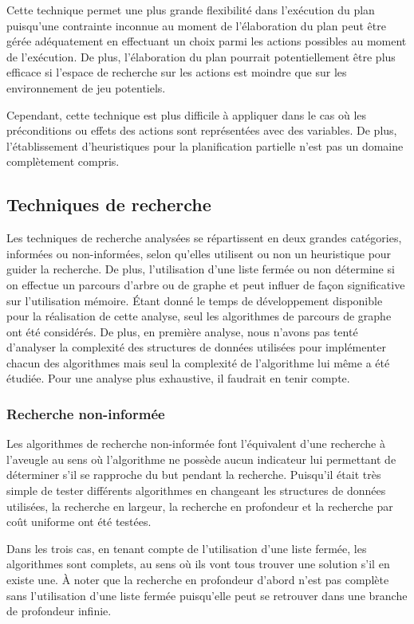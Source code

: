 \documentclass[12pt,english,frenchb,letterpaper]{article}
\begin{document}
Cette technique permet une plus grande flexibilité dans l'exécution du plan puisqu'une contrainte inconnue au moment de l'élaboration du plan peut être gérée adéquatement en effectuant un choix parmi les actions possibles au moment de l'exécution.  De plus, l'élaboration du plan pourrait potentiellement être plus efficace si l'espace de recherche sur les actions est moindre que sur les environnement de jeu potentiels.

Cependant, cette technique est plus difficile à appliquer dans le cas où les préconditions ou effets des actions sont représentées avec des variables.  De plus, l'établissement d'heuristiques pour la planification partielle n'est pas un domaine complètement compris.

\subsection{Techniques de recherche}
Les techniques de recherche analysées se répartissent en deux grandes catégories, informées ou non-informées, selon qu'elles utilisent ou non un heuristique pour guider la recherche.  De plus, l'utilisation d'une liste fermée ou non détermine si on effectue un parcours d'arbre ou de graphe et peut influer de fa\c con significative sur l'utilisation mémoire.  Étant donné le temps de développement disponible pour la réalisation de cette analyse, seul les algorithmes de parcours de graphe ont été considérés.  De plus, en première analyse, nous n'avons pas tenté d'analyser la complexité des structures de données utilisées pour implémenter chacun des algorithmes mais seul la complexité de l'algorithme lui même a été étudiée.  Pour une analyse plus exhaustive, il faudrait en tenir compte.

\subsubsection{Recherche non-informée}
Les algorithmes de recherche non-informée font l'équivalent d'une recherche à l'aveugle au sens où l'algorithme ne possède aucun indicateur lui permettant de déterminer s'il se rapproche du but pendant la recherche.  Puisqu'il était très simple de tester différents algorithmes en changeant les structures de données utilisées, la recherche en largeur, la recherche en profondeur et la recherche par coût uniforme ont été testées.

Dans les trois cas, en tenant compte de l'utilisation d'une liste fermée, les algorithmes sont complets, au sens où ils vont tous trouver une solution s'il en existe une. À noter que la recherche en profondeur d'abord n'est pas complète sans l'utilisation d'une liste fermée puisqu'elle peut se retrouver dans une branche de profondeur infinie.
\end{document}
